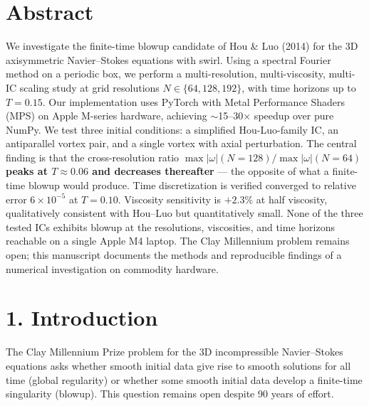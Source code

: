 \documentclass[11pt]{article}
\begin{document}
\begin{abstract}
\textbf{Scope.} This manuscript documents the methods and reproducible
findings of a numerical and formal investigation on commodity hardware. It
is \textbf{not} a contribution to the Clay Millennium problem. The Lean
theorems apply to the truncated spectral NS scheme at finite $N$; the
discrete-to-continuous bridge is not formalized; continuous NS at infinite
resolution is out of scope. The Clay problem remains open.
\end{abstract}




\section{Abstract}

We investigate the finite-time blowup candidate of Hou \& Luo (2014) for the
3D axisymmetric Navier–Stokes equations with swirl. Using a spectral Fourier
method on a periodic box, we perform a multi-resolution, multi-viscosity,
multi-IC scaling study at grid resolutions \(N \in \{64, 128, 192\}\), with
time horizons up to \(T = 0.15\). Our implementation uses PyTorch with Metal
Performance Shaders (MPS) on Apple M-series hardware, achieving
\(\sim\)15–30× speedup over pure NumPy. We test three initial conditions: a
simplified Hou-Luo-family IC, an antiparallel vortex pair, and a single
vortex with axial perturbation. The central finding is that the
cross-resolution ratio \(\max|\omega|(N{=}128) / \max|\omega|(N{=}64)\)
\textbf{peaks at \(T \approx 0.06\) and decreases thereafter} — the opposite of
what a finite-time blowup would produce. Time discretization is verified
converged to relative error \(6 \times 10^{-5}\) at \(T = 0.10\). Viscosity
sensitivity is \(+2.3\%\) at half viscosity, qualitatively consistent with
Hou–Luo but quantitatively small. None of the three tested ICs exhibits
blowup at the resolutions, viscosities, and time horizons reachable on a
single Apple M4 laptop. The Clay Millennium problem remains open; this
manuscript documents the methods and reproducible findings of a numerical
investigation on commodity hardware.


\section{1. Introduction}

The Clay Millennium Prize problem for the 3D incompressible Navier–Stokes
equations asks whether smooth initial data give rise to smooth solutions for
all time (global regularity) or whether some smooth initial data develop a
finite-time singularity (blowup). This question remains open despite 90 years
of effort.
\end{document}
